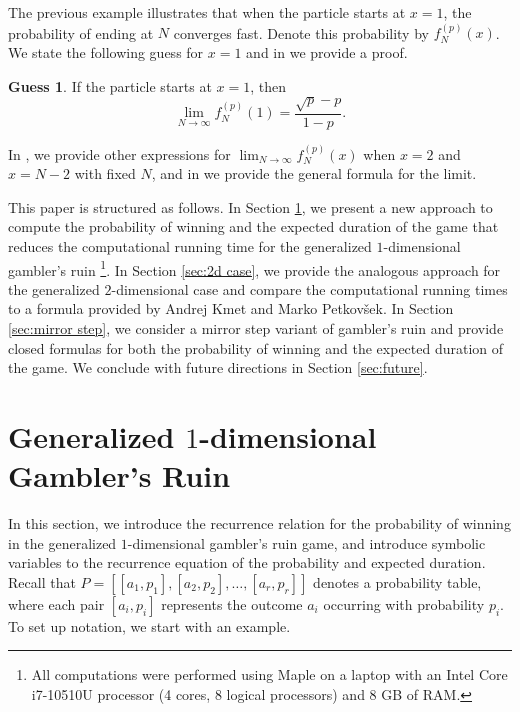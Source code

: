 \documentclass[reqno]{amsart}
\theoremstyle{definition}
\newtheorem{guess}[theorem]{Guess}
\theoremstyle{definition}
\theoremstyle{remark}
\begin{document}
The previous example illustrates that when the particle starts at $x=1$, the probability of ending at $N$ converges fast. Denote this probability by $f_N^{(p)}(x)$. We state the following guess for $x=1$ and in  we provide a proof.

\begin{guess}\label{guess:x=1}
If the particle starts at $x=1$, then
\[\lim_{N\to\infty}f_N^{(p)}(1)=\frac{\sqrt{p}-p}{1-p}.\]
\end{guess}

In , we provide other expressions for $\lim_{N\to \infty} f_N^{(p)}(x)$ when $x=2$ and $x=N-2$ with fixed $N$, and in  we provide the general formula for the limit.



This paper is structured as follows. In Section \ref{sec:general 1d}, we present a new approach to compute the probability of winning and the expected duration of the game that reduces the computational running time for the generalized $1$-dimensional gambler's ruin \footnote{All computations were performed using Maple on a laptop with an Intel Core i7-10510U processor (4 cores, 8 logical processors) and 8 GB of RAM.}. In Section \ref{sec:2d case}, we provide the analogous approach for the generalized $2$-dimensional case and compare the computational running times to a formula provided by Andrej Kmet and Marko Petkov\v{s}ek. In Section \ref{sec:mirror step}, we consider a mirror step variant of gambler's ruin and provide closed formulas for both the probability of winning and the expected duration of the game. We conclude with future directions in Section \ref{sec:future}.



\section{Generalized $1$-dimensional Gambler's Ruin}\label{sec:general 1d}

In this section, we introduce the recurrence relation for the probability of winning in the generalized $1$-dimensional gambler's ruin game, and introduce symbolic variables to the recurrence equation of the probability and expected duration. Recall that $P=[[a_1,p_1], [a_2,p_2],\ldots , [a_r,p_r]]$ denotes a probability table, where each pair $[a_i,p_i]$ represents the outcome $a_i$ occurring with probability $p_i$. To set up notation, we start with an example.
\end{document}

